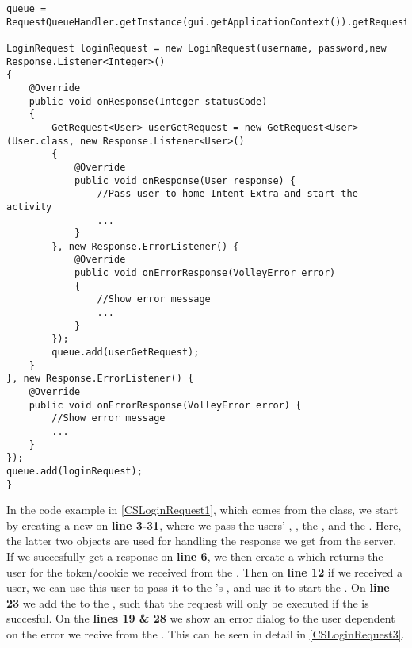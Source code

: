 \begin{minipage}[H]{\linewidth}
\begin{lstlisting}[caption = An example of a \ttt{LoginRequest}, label =
CSLoginRequest1] 
queue = RequestQueueHandler.getInstance(gui.getApplicationContext()).getRequestQueue();

LoginRequest loginRequest = new LoginRequest(username, password,new Response.Listener<Integer>() 
{
	@Override
    public void onResponse(Integer statusCode) 
    {
    	GetRequest<User> userGetRequest = new GetRequest<User>(User.class, new Response.Listener<User>() 
    	{
        	@Override
            public void onResponse(User response) {
            	//Pass user to home Intent Extra and start the activity 
            	...
           	}
        }, new Response.ErrorListener() {
        	@Override
            public void onErrorResponse(VolleyError error) 
            {
            	//Show error message
            	...
            }
        });
        queue.add(userGetRequest);
    }
}, new Response.ErrorListener() {
	@Override
    public void onErrorResponse(VolleyError error) {
    	//Show error message
    	...
    }
});
queue.add(loginRequest);
}
\end{lstlisting}
\end{minipage}

In the code example in \autoref{CSLoginRequest1}, which comes from the
 class, we start by creating a new  on
\textbf{line 3-31}, where we pass the users' ,
, the , and the . Here, the
latter two objects are used for handling the response we get from
the server.
If we succesfully get a response on \textbf{line 6}, we then create
a  which  returns
the user for the token/cookie we received from the . Then on
\textbf{line 12} if we received a user, we can use this user to pass it to
the 's , and use it to start the . On
\textbf{line 23} we add the  to the , such that
the request will only be executed if the  is succesful. On the
\textbf{lines 19 \& 28} we show an error dialog to the user dependent on the
error we recive from the . This can be seen in detail in \autoref{CSLoginRequest3}.\nl


